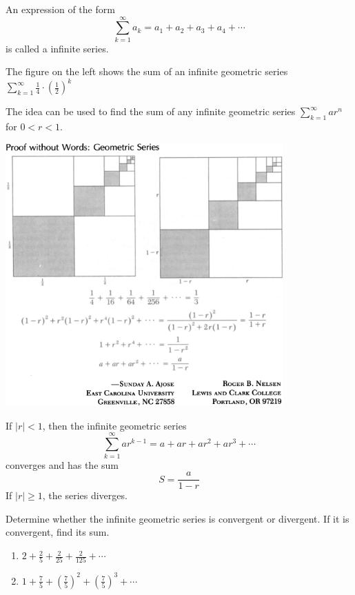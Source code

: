 \begin{definition}
    An expression of the form
    \[\sum_{k=1}^\infty a_k= a_1 + a_2 + a_3 + a_4 + \cdots\]
is called a infinite series.
\end{definition}

\begin{example}
The figure on the left shows the sum of an infinite geometric series $\sum\limits_{k=1}^\infty\frac14\cdot\left(\frac12\right)^k$

The idea can be used to find the sum of any infinite geometric series $\sum\limits_{k=1}^\infty ar^n$ for $0<r<1$.

\begin{center}
    \includegraphics[width=0.8\textwidth]{figs/infiniteseries-arn.png}
\end{center}
\end{example}

\begin{theorem}
If $|r|<1$, then the infinite geometric series
$$
\sum_{k=1}^{\infty} a r^{k-1}=a+a r+a r^2+a r^3+\cdots
$$
converges and has the sum
$$
S=\frac{a}{1-r}
$$
If $|r| \geq 1$, the series diverges.
\end{theorem}


\begin{example}
Determine whether the infinite geometric series is convergent or divergent. If it is convergent, find its sum.
\begin{enumerate}
    \item 
$2+\frac{2}{5}+\frac{2}{25}+\frac{2}{125}+\cdots$
\item
$1+\frac{7}{5}+\left(\frac{7}{5}\right)^2+\left(\frac{7}{5}\right)^3+\cdots$
\end{enumerate}
\end{example}

